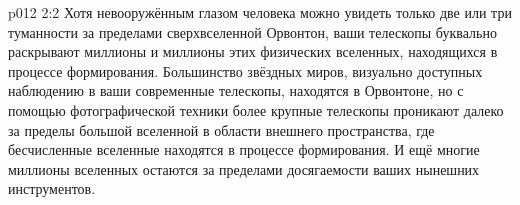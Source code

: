 \vs p012 2:2 Хотя невооружённым глазом человека можно увидеть только две или три туманности за пределами сверхвселенной Орвонтон, ваши телескопы буквально раскрывают миллионы и миллионы этих физических вселенных, находящихся в процессе формирования. Большинство звёздных миров, визуально доступных наблюдению в ваши современные телескопы, находятся в Орвонтоне, но с помощью фотографической техники более крупные телескопы проникают далеко за пределы большой вселенной в области внешнего пространства, где бесчисленные вселенные находятся в процессе формирования. И ещё многие миллионы вселенных остаются за пределами досягаемости ваших нынешних инструментов.
